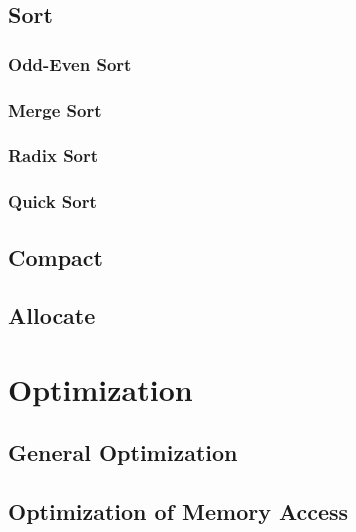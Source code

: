 \documentclass[12px,oz]{report}
\theoremstyle{indented}
\theoremstyle{indented}
\begin{document}
	\section{Sort}
	\label{sec:al_sort}
	
	
		\subsection{Odd-Even Sort}
		\label{sec:al_sort_odd}
		
		
		\subsection{Merge Sort}
		\label{sec:al_sort_merge}
		
	
		\subsection{Radix Sort}
		\label{sec:al_sort_radix}
		

		\subsection{Quick Sort}
		\label{sec:al_sor_quick}
		

	\section{Compact}
	\label{sec-compact}
	
	
	\section{Allocate}
	\label{sec-allocate}
	
	
\chapter{Optimization}
\label{ch-opti-intro}


\section{General Optimization}
\label{sec-general-opti}


\section{Optimization of Memory Access}
\label{sec-opti-memory}

\end{document}
